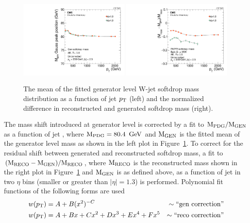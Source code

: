 \begin{figure}[h!]
\centering
\includegraphics[width=0.49\textwidth]{figures/analysis/search2/AN-16-235/plots/GenSoftdropMass_vspt.pdf}
\includegraphics[width=0.49\textwidth]{figures/analysis/search2/AN-16-235/plots/MassShift_vspt.pdf}
\caption{The mean of the fitted generator level W-jet softdrop mass distribution as a function of jet $p_{\mathrm{T}}$ (left) and the normalized difference in reconstructed and generated softdrop mass (right).}
\label{fig:searchII:sdmassshifts}
\end{figure}
The mass shift introduced at generator level is corrected by a fit to $\rm{M_{PDG}/M_{GEN}}$ as a function of jet \PT, where $\rm{M_{PDG}}=80.4~\,\text{Ge\hspace{-.08em}V}$ and $\rm{M_{GEN}}$ is the fitted mean of the generator level mass as shown in the left plot in Figure~\ref{fig:searchII:sdmassshifts}. To correct for the residual shift between generated and reconstructed softdrop mass, a fit to $\rm{(M_{RECO}-M_{GEN})/M_{RECO}}$, where $\rm{M_{RECO}}$ is the reconstructed mass shown in the right plot in Figure~\ref{fig:searchII:sdmassshifts} and $\rm{M_{GEN}}$ is as defined above, as a function of jet \PT in two $\eta$ bins (smaller or greater than $|\eta|=1.3$) is performed.
Polynomial fit functions of the following forms are used
\begin{align*} 
w(p_{\mathrm{T}}) &=  A  +B(x^{2})^{-C}          &\sim\textrm{``gen correction''}\\
w(p_{\mathrm{T}}) &=  A  +Bx+Cx^2+Dx^3+Ex^4+Fx^5 &\sim\textrm{``reco correction''} 
\end{align*}
